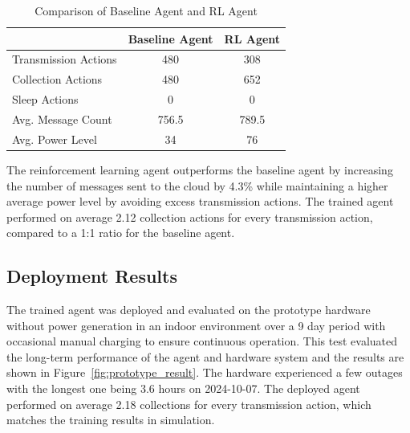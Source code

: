 \documentclass[10pt]{cai}
\begin{document}
\begin{table}[h]
  \centering
  \begin{tabular}{lcc}
      \toprule
      & Baseline Agent & RL Agent \\
      \midrule
      Transmission Actions & 480 & 308 \\
      Collection Actions & 480 & 652 \\
      Sleep Actions & 0 & 0 \\
      Avg. Message Count & 756.5 & 789.5 \\
      Avg. Power Level & 34 & 76 \\
      \bottomrule
  \end{tabular}
  \caption{Comparison of Baseline Agent and RL Agent}
  \label{tab:agent_comparison}
\end{table}

The reinforcement learning agent outperforms the baseline agent by increasing the number of messages sent to the cloud by 4.3\% while maintaining a higher average power level by avoiding excess transmission actions.
The trained agent performed on average 2.12 collection actions for every transmission action, compared to a 1:1 ratio for the baseline agent.

\subsection{Deployment Results}

The trained agent was deployed and evaluated on the prototype hardware without power generation in an indoor environment over a 9 day period with occasional manual charging to ensure continuous operation.
This test evaluated the long-term performance of the agent and hardware system and the results are shown in Figure~\ref{fig:prototype_result}.
The hardware experienced a few outages with the longest one being 3.6 hours on 2024-10-07.
The deployed agent performed on average 2.18 collections for every transmission action, which matches the training results in simulation.
\end{document}
